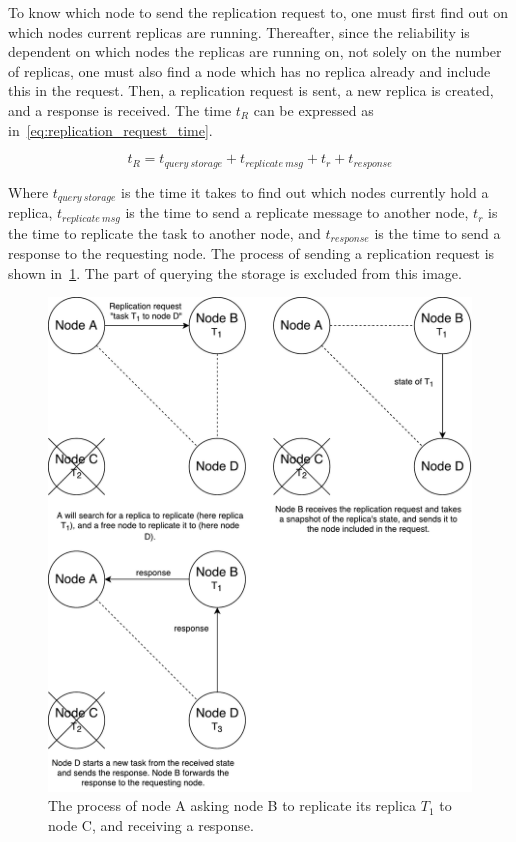 \documentclass{cslthse-msc}
\begin{document}
To know which node to send the replication request to, one must first find out on which nodes current replicas are running. Thereafter, since the reliability is dependent on which nodes the replicas are running on, not solely on the number of replicas, one must also find a node which has no replica already and include this in the request. Then, a replication request is sent, a new replica is created, and a response is received. The time $t_R$ can be expressed as in~\cref{eq:replication_request_time}.

\begin{equation} \label{eq:replication_request_time}
t_R = t_{query\ storage} + t_{replicate\ msg} + t_{r} + t_{response}
\end{equation} 

Where $t_{query\ storage}$ is the time it takes to find out which nodes currently hold a replica, $t_{replicate\ msg}$ is the time to send a replicate message to another node, $t_{r}$ is the time to replicate the task to another node, and $t_{response}$ is the time to send a response to the requesting node. The process of sending a replication request is shown in~\cref{fig:replication_request}. The part of querying the storage is excluded from this image.

\begin{figure}[!hbt]
\centering
\includegraphics[scale=0.5]{images/replication_request.pdf}
\caption{The process of node A asking node B to replicate its replica $T_{1}$ to node C, and receiving a response.}\label{fig:replication_request}
\end{figure}
\end{document}
